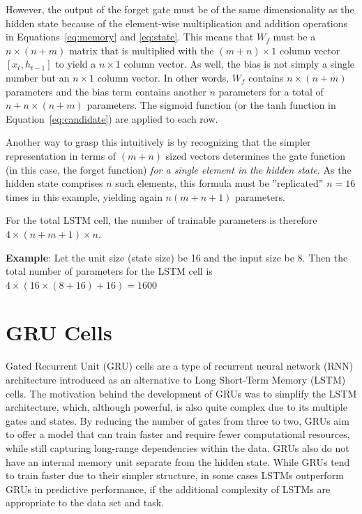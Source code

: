 However, the output of the forget gate must be of the same dimensionality as the hidden state because of the element-wise multiplication and addition operations in Equations~\ref{eq:memory} and \ref{eq:state}. This means that $W_f$ must be a $n \times (n+m)$ matrix that is multiplied with the $(m+n) \times 1$ column vector $[x_t, h_{t-1}]$ to yield a $n \times 1$ column vector. As well, the bias is not simply a single number but an $n \times 1$ column vector. In other words, $W_f$ contains $n \times (n+m)$ parameters and the bias term contains another $n$ parameters for a total of $n+n\times(n+m)$ parameters. The sigmoid function (or the tanh function in Equation~\ref{eq:candidate}) are applied to each row.

Another way to grasp this intuitively is by recognizing that the simpler representation in terms of $(m+n)$ sized vectors determines the gate function (in this case, the forget function) \emph{for a single element in the hidden state}. As the hidden state comprises $n$ such elements, this formula must be ''replicated'' $n=16$ times in this example, yielding again $n (m+n+1)$ parameters.

For the total LSTM cell, the number of trainable parameters is therefore $4 \times (n + m + 1) \times n$.

\textbf{Example}: Let the unit size (state size) be 16 and the input size be 8. Then the total number of parameters for the LSTM cell is $4 \times (16 \times (8+16) + 16) = 1600$

\section{GRU Cells}

Gated Recurrent Unit (GRU) cells are a type of recurrent neural network (RNN) architecture introduced as an alternative to Long Short-Term Memory (LSTM) cells. The motivation behind the development of GRUs was to simplify the LSTM architecture, which, although powerful, is also quite complex due to its multiple gates and states. By reducing the number of gates from three to two, GRUs aim to offer a model that can train faster and require fewer computational resources, while still capturing long-range dependencies within the data. GRUs also do not have an internal memory unit separate from the hidden state. While GRUs tend to train faster due to their simpler structure, in some cases LSTMs outperform GRUs in predictive performance, if the additional complexity of LSTMs are appropriate to the data set and task.

